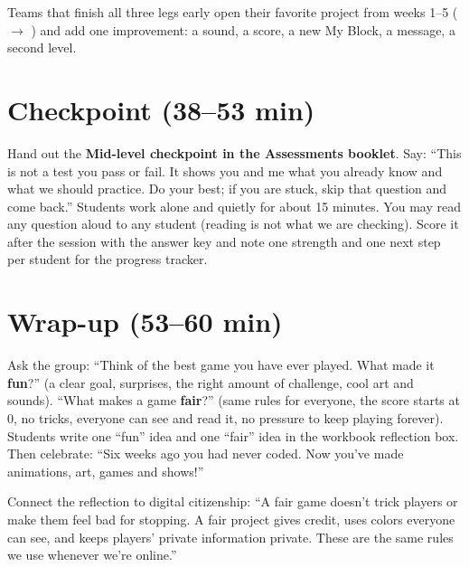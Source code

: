 \begin{freebuild}
Teams that finish all three legs early open their favorite project from weeks 1--5 ( $\rightarrow$ ) and add one improvement: a sound, a score, a new My Block, a message, a second level.
\end{freebuild}

\section{Checkpoint (38--53 min)}
\begin{teachernote}
Hand out the \textbf{Mid-level checkpoint in the Assessments booklet}. Say: \enquote{This is not a test you pass or fail. It shows you and me what you already know and what we should practice. Do your best; if you are stuck, skip that question and come back.} Students work alone and quietly for about 15 minutes. You may read any question aloud to any student (reading is not what we are checking). Score it after the session with the answer key and note one strength and one next step per student for the progress tracker.
\end{teachernote}

\section{Wrap-up (53--60 min)}
\begin{reflection}
Ask the group: \enquote{Think of the best game you have ever played. What made it \textbf{fun}?} (a clear goal, surprises, the right amount of challenge, cool art and sounds). \enquote{What makes a game \textbf{fair}?} (same rules for everyone, the score starts at 0, no tricks, everyone can see and read it, no pressure to keep playing forever). Students write one \enquote{fun} idea and one \enquote{fair} idea in the workbook reflection box. Then celebrate: \enquote{Six weeks ago you had never coded. Now you've made animations, art, games and shows!}
\end{reflection}

\begin{safety}
Connect the reflection to digital citizenship: \enquote{A fair game doesn't trick players or make them feel bad for stopping. A fair project gives credit, uses colors everyone can see, and keeps players' private information private. These are the same rules we use whenever we're online.}
\end{safety}

